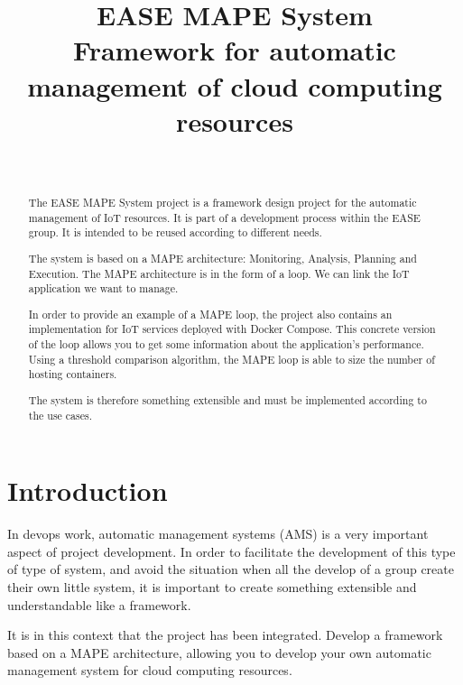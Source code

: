 \documentclass[11pt]{IEEEtran}
\begin{document}
\title{EASE MAPE System\\Framework for automatic management of cloud computing resources\\}
\author{
\\
}
\maketitle

\begin{abstract}
 The EASE MAPE System project is a framework design project for the automatic management of IoT resources. It is part of a development process within the EASE group. It is intended to be reused according to different needs. 
 
 The system is based on a MAPE architecture: Monitoring, Analysis, Planning and Execution. The MAPE architecture is in the form of a loop. We can link the IoT application we want to manage.
 
 In order to provide an example of a MAPE loop, the project also contains an implementation for IoT services deployed with Docker Compose. This concrete version of the loop allows you to get some information about the application's performance. Using a threshold comparison algorithm, the MAPE loop is able to size the number of hosting containers.
 
 The system is therefore something extensible and must be implemented according to the use cases.
\end{abstract}
\section{Introduction}
In devops work, automatic management systems (AMS) is a very important aspect of project development. In order to facilitate the development of this type of type of system, and avoid the situation when all the develop of a group create their own little system, it is important to create something extensible and understandable like a framework.

It is in this context that the project has been integrated. Develop a framework based on a MAPE architecture, allowing you to develop your own automatic management system for cloud computing resources.
\end{document}
